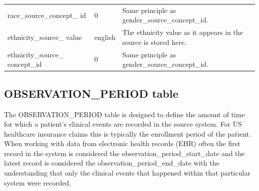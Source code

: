 \documentclass[11pt]{book}
\begin{document}
\begin{longtable}[]{@{}lll@{}}
\begin{minipage}[t]{0.28\columnwidth}\raggedright\strut
race\_source\_concept\_ id\strut
\end{minipage} & \begin{minipage}[t]{0.16\columnwidth}\raggedright\strut
0\strut
\end{minipage} & \begin{minipage}[t]{0.48\columnwidth}\raggedright\strut
Same principle as gender\_source\_concept\_id.\strut
\end{minipage}\tabularnewline
\begin{minipage}[t]{0.28\columnwidth}\raggedright\strut
ethnicity\_source\_ value\strut
\end{minipage} & \begin{minipage}[t]{0.16\columnwidth}\raggedright\strut
english\strut
\end{minipage} & \begin{minipage}[t]{0.48\columnwidth}\raggedright\strut
The ethnicity value as it appears in the source is stored here.\strut
\end{minipage}\tabularnewline
\begin{minipage}[t]{0.28\columnwidth}\raggedright\strut
ethnicity\_source\_ concept\_id\strut
\end{minipage} & \begin{minipage}[t]{0.16\columnwidth}\raggedright\strut
0\strut
\end{minipage} & \begin{minipage}[t]{0.48\columnwidth}\raggedright\strut
Same principle as gender\_source\_concept\_id.\strut
\end{minipage}\tabularnewline
\bottomrule
\end{longtable}

\subsection{OBSERVATION\_PERIOD table}\label{observationPeriod}

The OBSERVATION\_PERIOD table is designed to define the amount of time
for which a patient's clinical events are recorded in the source system.
For US healthcare insurance claims this is typically the enrollment
period of the patient. When working with data from electronic health
records (EHR) often the first record in the system is considered the
observation\_period\_start\_date and the latest record is considered the
observation\_period\_end\_date with the understanding that only the
clinical events that happened within that particular system were
recorded.
\end{document}
